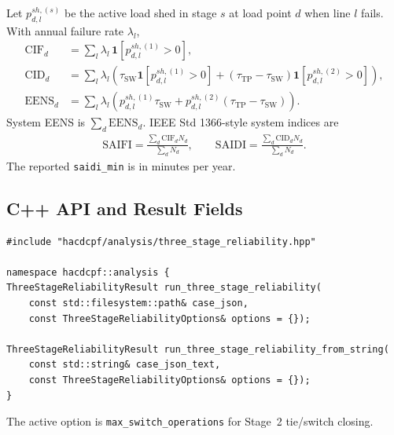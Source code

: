 Let $p^{sh,(s)}_{d,l}$ be the active load shed in stage $s$ at load point $d$
when line $l$ fails.  With annual failure rate $\lambda_l$,
\begin{align}
\mathrm{CIF}_d &= \sum_l \lambda_l\,
\mathbf{1}\!\left[p^{sh,(1)}_{d,l}>0\right], \label{eq:cif}\\
\mathrm{CID}_d &= \sum_l \lambda_l\left(
\tau_{\mathrm{SW}}\mathbf{1}\!\left[p^{sh,(1)}_{d,l}>0\right]
+(\tau_{\mathrm{TP}}-\tau_{\mathrm{SW}})
\mathbf{1}\!\left[p^{sh,(2)}_{d,l}>0\right]\right), \label{eq:cid}\\
\mathrm{EENS}_d &= \sum_l \lambda_l\left(
p^{sh,(1)}_{d,l}\tau_{\mathrm{SW}}
+p^{sh,(2)}_{d,l}(\tau_{\mathrm{TP}}-\tau_{\mathrm{SW}})\right).
\label{eq:eens-nodal}
\end{align}
System EENS is $\sum_d\mathrm{EENS}_d$.  IEEE Std 1366-style system indices are
\begin{align}
\mathrm{SAIFI} = \frac{\sum_d \mathrm{CIF}_d N_d}{\sum_d N_d},
\qquad
\mathrm{SAIDI} = \frac{\sum_d \mathrm{CID}_d N_d}{\sum_d N_d}.
\label{eq:saifi-saidi}
\end{align}
The reported \texttt{saidi\_min} is in minutes per year.

\subsection{C++ API and Result Fields}
\label{sec:3stage-api}

\begin{verbatim}
#include "hacdcpf/analysis/three_stage_reliability.hpp"

namespace hacdcpf::analysis {
ThreeStageReliabilityResult run_three_stage_reliability(
    const std::filesystem::path& case_json,
    const ThreeStageReliabilityOptions& options = {});

ThreeStageReliabilityResult run_three_stage_reliability_from_string(
    const std::string& case_json_text,
    const ThreeStageReliabilityOptions& options = {});
}
\end{verbatim}

The active option is \texttt{max\_switch\_operations} for Stage~2 tie/switch
closing.

